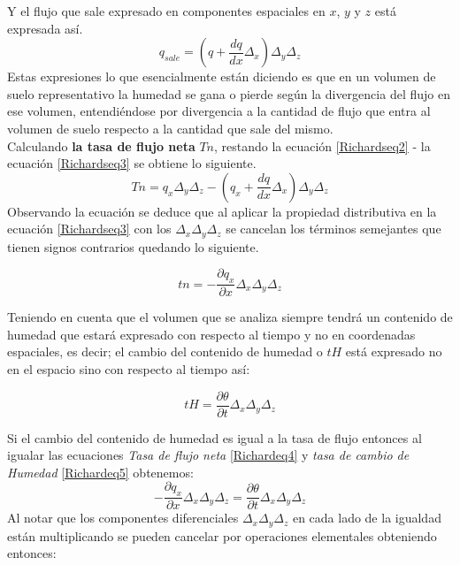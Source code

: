 Y el flujo que sale expresado en componentes espaciales en $x$, $y$ y $z$ está expresada así.
\begin{equation}
	q_{sale}=(q+ \frac{dq}{dx}\varDelta_{x})\varDelta_{y}\varDelta_{z}
	\label{Richardseq3}
\end{equation}
Estas expresiones lo que esencialmente están diciendo es que en un volumen de suelo representativo la humedad se gana o pierde según la divergencia del flujo en ese volumen, entendiéndose por divergencia a la cantidad de flujo que entra al volumen de suelo respecto a la cantidad que sale del mismo.\\


Calculando  \textbf{la tasa de flujo neta} $Tn$, restando la ecuación \eqref{Richardseq2} - la ecuación \eqref{Richardseq3} se obtiene lo siguiente.
$$ Tn = q_{x} \varDelta_{y}\varDelta_{z} - (q_{x}+ \frac{dq}{dx}\varDelta_{x})\varDelta_{y}\varDelta_{z}$$
Observando la ecuación se deduce que al aplicar la propiedad distributiva en la ecuación \eqref{Richardseq3} con los $\varDelta_{x}\varDelta_{y}\varDelta_{z}$ se cancelan los términos semejantes que tienen signos contrarios quedando lo siguiente.

\begin{equation}
	tn = - \frac{\partial q_{x}}{\partial x } \varDelta_{x}\varDelta_{y}\varDelta_{z}
	\label{Richardeq4}
\end{equation}

Teniendo en cuenta que el volumen que se analiza siempre tendrá un contenido de humedad que estará expresado con respecto al tiempo y no en coordenadas espaciales, es decir; el cambio del contenido de humedad o $tH$ está expresado no en el espacio sino con respecto al tiempo así:

\begin{equation}
	tH = \frac{\partial \theta}{\partial t} \varDelta_{x}\varDelta_{y}\varDelta_{z}
	\label{Richardeq5}
\end{equation}

Si el cambio del contenido de humedad es igual a la tasa de flujo entonces al igualar las ecuaciones \textit{Tasa de flujo neta} \eqref{Richardeq4} y \textit{tasa de cambio de Humedad} \eqref{Richardeq5} obtenemos:
$$- \frac{\partial q_{x}}{\partial x } \varDelta_{x}\varDelta_{y}\varDelta_{z} =  \frac{\partial \theta}{\partial t} \varDelta_{x}\varDelta_{y}\varDelta_{z}$$
Al notar que los componentes diferenciales $\varDelta_{x}\varDelta_{y}\varDelta_{z}$ en cada lado de la igualdad están multiplicando se pueden cancelar por operaciones elementales obteniendo entonces: 

